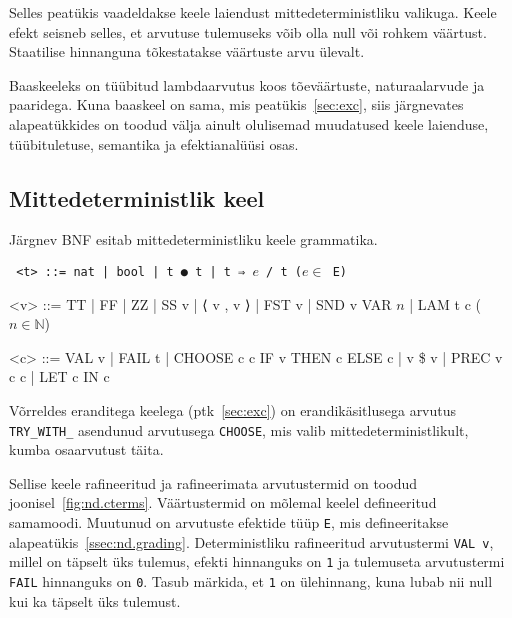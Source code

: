 \documentclass[a4paper,12pt]{article}
\begin{document}
Selles peatükis vaadeldakse keele laiendust mittedeterministliku valikuga.
Keele efekt seisneb selles, et arvutuse tulemuseks võib olla null või rohkem väärtust.
Staatilise hinnanguna tõkestatakse väärtuste arvu ülevalt.

Baaskeeleks on tüübitud lambdaarvutus koos tõeväärtuste, naturaalarvude ja paaridega.
Kuna baaskeel on sama, mis peatükis~\ref{sec:exc}, siis järgnevates alapeatükkides on toodud välja ainult olulisemad muudatused keele laienduse, tüübituletuse, semantika ja efektianalüüsi osas.


\subsection{Mittedeterministlik keel}

Järgnev BNF esitab mittedeterministliku keele grammatika.
\begin{adjustwidth}{1em}{0pt}
\begin{grammar}\tt
<t> ::= nat | bool | t ● t | t ⇒ $e$ / t \hfill ($e \in$ E)
  
<v> ::= TT | FF | ZZ | SS v | ⟨ v , v ⟩ | FST v | SND v
    \alt VAR $n$ | LAM t c \hfill ($n \in \mathbb N$)
  
<c> ::= VAL v | FAIL t | CHOOSE c c
    \alt IF v THEN c ELSE c | v \$ v | PREC v c c | LET c IN c
\end{grammar}
\end{adjustwidth}

Võrreldes eranditega keelega (ptk~\ref{sec:exc}) on erandikäsitlusega arvutus {\tt TRY_WITH_} asendunud arvutusega {\tt CHOOSE}, mis valib mittedeterministlikult, kumba osaarvutust täita.

Sellise keele rafineeritud ja rafineerimata arvutustermid on toodud joonisel~\ref{fig:nd.cterms}.
Väärtustermid on mõlemal keelel defineeritud samamoodi.
Muutunud on arvutuste efektide tüüp {\tt E}, mis defineeritakse alapeatükis~\ref{ssec:nd.grading}.
Deterministliku rafineeritud arvutustermi {\tt VAL v}, millel on täpselt üks tulemus, efekti hinnanguks on {\tt 1} ja tulemuseta arvutustermi {\tt FAIL} hinnanguks on {\tt 0}.
Tasub märkida, et {\tt 1} on ülehinnang, kuna lubab nii null kui ka täpselt üks tulemust.
\end{document}

